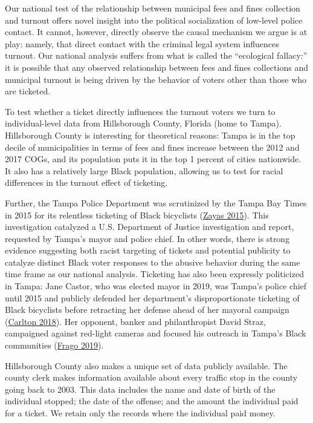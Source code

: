 \documentclass[
  12pt,
]{article}
\begin{document}
Our national test of the relationship between municipal fees and fines collection and turnout offers novel insight into the political socialization of low-level police contact. It cannot, however, directly observe the causal mechanism we argue is at play: namely, that direct contact with the criminal legal system influences turnout. Our national analysis suffers from what is called the ``ecological fallacy:'' it is possible that any observed relationship between fees and fines collections and municipal turnout is being driven by the behavior of voters other than those who are ticketed.

To test whether a ticket directly influences the turnout voters we turn to individual-level data from Hillsborough County, Florida (home to Tampa). Hillsborough County is interesting for theoretical reasons: Tampa is in the top decile of municipalities in terms of fees and fines increase between the 2012 and 2017 COGs, and its population puts it in the top 1 percent of cities nationwide. It also has a relatively large Black population, allowing us to test for racial differences in the turnout effect of ticketing.

Further, the Tampa Police Department was scrutinized by the Tampa Bay Times in 2015 for its relentless ticketing of Black bicyclists (\protect\hyperlink{ref-Zayas2015}{Zayas 2015}). This investigation catalyzed a U.S. Department of Justice investigation and report, requested by Tampa's mayor and police chief. In other words, there is strong evidence suggesting both racist targeting of tickets and potential publicity to catalyze distinct Black voter responses to the abusive behavior during the same time frame as our national analysis. Ticketing has also been expressly politicized in Tampa: Jane Castor, who was elected mayor in 2019, was Tampa's police chief until 2015 and publicly defended her department's disproportionate ticketing of Black bicyclists before retracting her defense ahead of her mayoral campaign (\protect\hyperlink{ref-Carlton2018}{Carlton 2018}). Her opponent, banker and philanthropist David Straz, campaigned against red-light cameras and focused his outreach in Tampa's Black communities (\protect\hyperlink{ref-Frago2019}{Frago 2019}).

Hillsborough County also makes a unique set of data publicly available. The county clerk makes information available about every traffic stop in the county going back to 2003. This data includes the name and date of birth of the individual stopped; the date of the offense; and the amount the individual paid for a ticket. We retain only the records where the individual paid money.
\end{document}
